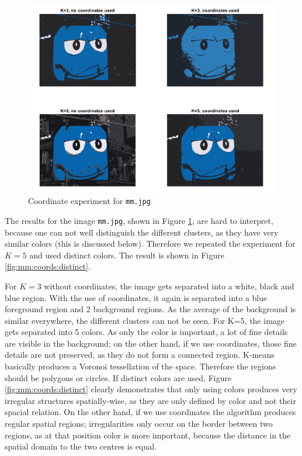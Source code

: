 \begin{figure}[h!]
\centering
\includegraphics[width = 0.8\linewidth]{figures/task2/mm_coordinates.png}
\caption{Coordinate experiment for \texttt{mm.jpg}}
\label{fig:mm:coords}
\end{figure}

The results for the image \texttt{mm.jpg}, shown in Figure \ref{fig:mm:coords}, are hard to interpret, because one can not well distinguish the different clusters, as they have very similar colors (this is discussed below). Therefore we repeated the experiment for $K=5$ and used distinct colors. The result is shown in Figure \ref{fig:mm:coords:distinct}. 

For $K=3$ without coordinates, the image gets separated into a white, black and blue region. With the use of coordinates, it again is separated into a blue foreground region and 2 background regions. As the average of the background is similar everywhere, the different clusters can not be seen. For K=5, the image gets separated into 5 colors. As only the color is important, a lot of fine details are visible in the background; on the other hand, if we use coordinates, those fine details are not preserved, as they do not form a connected region. K-means basically produces a Voronoi tessellation of the space. Therefore the regions should be polygons or circles. If distinct colors are used, Figure \ref{fig:mm:coords:distinct} clearly demonstrates that only using colors produces very irregular structures spatially-wise, as they are only defined by color and not their spacial relation. On the other hand, if we use coordinates the algorithm produces regular spatial regions; irregularities only occur on the border between two regions, as at that position color is more important, because the distance in the spatial domain to the two centres is equal.

